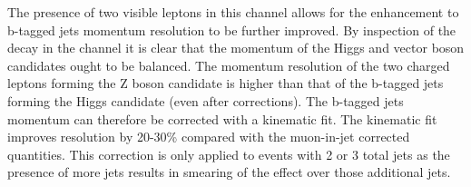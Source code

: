 The presence of two visible leptons in this channel allows for the enhancement
to b-tagged jets momentum resolution to be further improved. By inspection of
the decay in the channel it is clear that the momentum of the Higgs and vector
boson candidates ought to be balanced. The momentum resolution of the two
charged leptons forming the Z boson candidate is higher than that of the
b-tagged jets forming the Higgs candidate (even after corrections). The b-tagged
jets momentum can therefore be corrected with a kinematic fit. The kinematic fit
improves resolution by 20-30\% compared with the muon-in-jet corrected
quantities. This correction is only applied to events with 2 or 3 total jets as
the presence of more jets results in smearing of the effect over those
additional jets.

